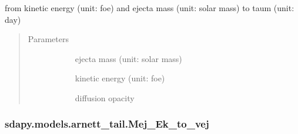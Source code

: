 \documentclass[letterpaper,10pt,english]{sphinxmanual}
\begin{document}
\begin{fulllineitems}
\label{\detokenize{generated/sdapy.models.arnett_tail.Mej_Ek_to_taum:sdapy.models.arnett_tail.Mej_Ek_to_taum}}
from kinetic energy (unit: foe) and ejecta mass (unit: solar mass) to taum (unit: day)
\begin{quote}\begin{description}
\item[{Parameters}] \leavevmode\begin{description}
\item[{}] \leavevmode{[}\sphinxtitleref{float}{]}
ejecta mass (unit: solar mass)

\item[{}] \leavevmode{[}\sphinxtitleref{float}{]}
kinetic energy (unit: foe)

\item[{}] \leavevmode{[}\sphinxtitleref{float}{]}
diffusion opacity

\end{description}

\end{description}\end{quote}

\end{fulllineitems}



\subsubsection{sdapy.models.arnett\_tail.Mej\_Ek\_to\_vej}
\label{\detokenize{generated/sdapy.models.arnett_tail.Mej_Ek_to_vej:sdapy-models-arnett-tail-mej-ek-to-vej}}\label{\detokenize{generated/sdapy.models.arnett_tail.Mej_Ek_to_vej::doc}}
\end{document}
